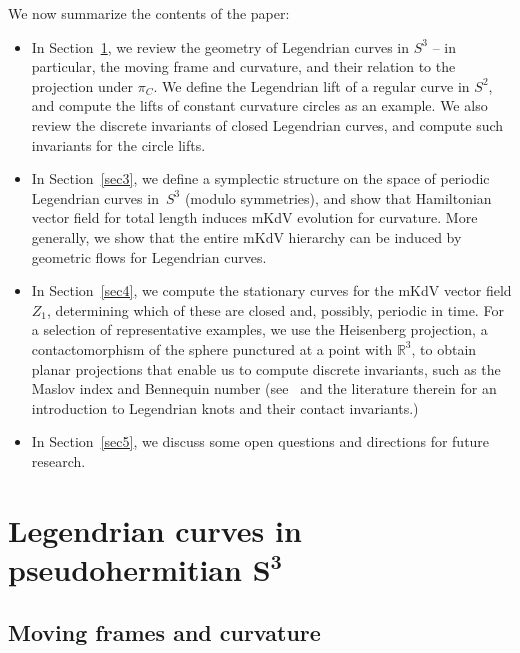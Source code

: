 \documentclass[10pt,a4paper]{amsart}
\def\R{\mathbb R}
\numberwithin{equation}{section}
\begin{document}
We now summarize the contents of the paper:
\begin{itemize}\itemsep=0pt
\item[--]
In Section~\ref{sec2}, we review the geometry of Legendrian curves in $S^3$ -- in particular, the moving frame and curvature, and their relation to the projection under $\pi_C$. We define the Legendrian lift of a regular curve
in $S^2$, and compute the lifts of constant curvature circles as an example. We also review the discrete invariants of closed Legendrian curves, and compute such invariants for the circle lifts.
\item[--]
In Section~\ref{sec3}, we define a symplectic structure on the space of periodic Legendrian curves in~$S^3$ (modulo symmetries), and show that Hamiltonian vector field for total length induces mKdV evolution for curvature. More generally, we show that the entire mKdV hierarchy
can be induced by geometric flows for Legendrian curves.
\item[--]
In Section~\ref{sec4}, we compute the stationary curves for the mKdV vector field $Z_1$,
determining which of these are closed and, possibly, periodic in time. For a selection of representative examples, we use the Heisenberg projection, a contactomorphism of the sphere punctured at a point with $\R^3$, to obtain planar projections
that enable us to compute discrete invariants,
such as the Maslov index and Bennequin number (see~\cite{ET1} and the literature therein for an introduction to Legendrian knots and their contact invariants.)
\item[--]
In Section~\ref{sec5}, we discuss some open questions and directions for future research.
\end{itemize}


\section[Legendrian curves in pseudohermitian S\^{}3]{Legendrian curves in pseudohermitian $\boldsymbol{S^3}$}\label{sec2}
\subsection{Moving frames and curvature}\label{geometrysection}
\end{document}
